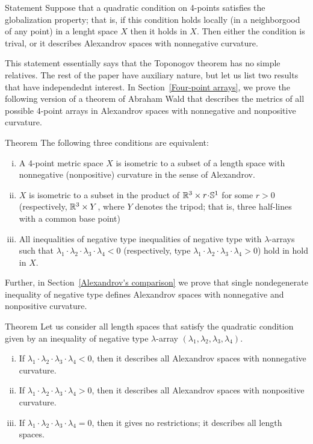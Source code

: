 \documentclass[a4paper,10pt]{article}
\begin{document}
\begin{thmA}{Statement}
Suppose that a quadratic condition on 4-points satisfies the globalization property;
that is, if this condition holds locally (in a neighborgood of any point) in a lenght space $X$ then it holds in $X$.
Then either the condition is trival, or it describes Alexandrov spaces with nonnegative curvature.
\end{thmA}

This statement essentially says that the Toponogov theorem has no simple relatives.
The rest of the paper have auxiliary nature, but let us list two results that have independednt interest.
In Section~\ref{Four-point arrays}, we prove the following version of a theorem of Abraham Wald \cite[§ 7]{wald} that describes the metrics of all possible 4-point arrays in Alexandrov spaces with nonnegative and nonpositive curvature.

\begin{thmA}{Theorem}
The following three conditions are equivalent:
\begin{enumerate}[(i)]
\item A 4-point metric space $X$ is isometric to a subset of a length space with nonnegative (nonpositive) curvature in the sense of Alexandrov.
\item $X$ is isometric to a subset in the product of $\RR^3\times r\cdot \SSS^1$ for some $r>0$ (respectively, $\mathbb{R}^3\times Y$, where $Y$ denotes the tripod; that is, three half-lines with a common base point)
\item All inequalities of negative type inequalities of negative type with $\lambda$-arrays such that $\lambda_1\cdot\lambda_2\cdot\lambda_3\cdot\lambda_4<0$ (respectively, type $\lambda_1\cdot\lambda_2\cdot\lambda_3\cdot\lambda_4>0$) hold in hold in $X$.
\end{enumerate}
\end{thmA}

Further, in Section~\ref{Alexandrov's comparison} we prove that single nondegenerate inequality of negative type defines Alexandrov spaces with nonnegative and nonpositive curvature.

\begin{thmA}{Theorem}
Let us consider all length spaces that satisfy the quadratic condition given by an inequality of negative type $\lambda$-array $(\lambda_1,\lambda_2,\lambda_3,\lambda_4)$.
\begin{enumerate}[(i)]
\item If $\lambda_1\cdot\lambda_2\cdot\lambda_3\cdot\lambda_4<0$, then it describes all Alexandrov spaces with nonnegative curvature.
\item If $\lambda_1\cdot\lambda_2\cdot\lambda_3\cdot\lambda_4>0$, then it describes all Alexandrov spaces with nonpositive curvature.
\item If $\lambda_1\cdot\lambda_2\cdot\lambda_3\cdot\lambda_4=0$, then it gives no restrictions; it describes all length spaces.
\end{enumerate}

\end{thmA}
\end{document}
